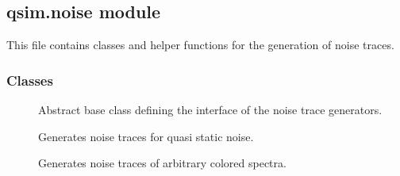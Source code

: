 \documentclass[letterpaper,10pt,english]{sphinxmanual}
\begin{document}
\subsection{qsim.noise module}
\label{\detokenize{qsim:module-qsim.noise}}\label{\detokenize{qsim:qsim-noise-module}}
This file contains classes and helper functions for the generation of noise
traces.


\subsubsection{Classes}
\label{\detokenize{qsim:id17}}\begin{description}
\item[{{\hyperref[\detokenize{qsim:qsim.noise.NoiseTraceGenerator}]{}}}] \leavevmode
Abstract base class defining the interface of the noise trace generators.

\item[{{\hyperref[\detokenize{qsim:qsim.noise.NTGQuasiStatic}]{}}}] \leavevmode
Generates noise traces for quasi static noise.

\item[{{\hyperref[\detokenize{qsim:qsim.noise.NTGColoredNoise}]{}}}] \leavevmode
Generates noise traces of arbitrary colored spectra.

\end{description}
\end{document}
